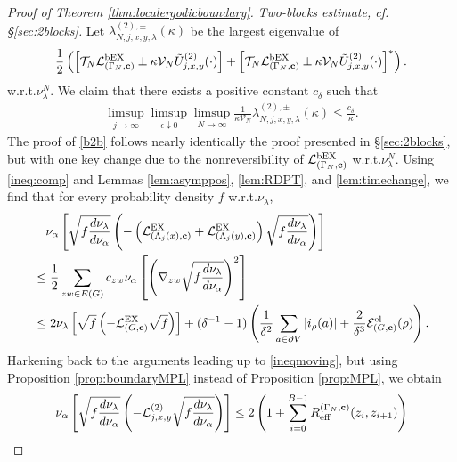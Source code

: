 \documentclass[11pt]{amsart}
\theoremstyle{plain}
\theoremstyle{definition}
\theoremstyle{remark}
\begin{document}
\begin{proof}[Proof of Theorem \ref{thm:localergodicboundary}]
\emph{Two-blocks estimate, \emph{cf.\@} \S\ref{sec:2blocks}.} 
Let $\lambda^{(2),\pm}_{N,j,x,y,\lambda}(\kappa)$ be the largest eigenvalue of
\begin{align*}
\frac{1}{2}\left(\left[\mathcal{T}_N \mathcal{L}^{\rm bEX}_{(\Gamma_N,{\bf c})} \pm \kappa \mathcal{V}_N {\tilde{U}^{(2)}_{{{j}},{{x}},{{y}}}}(\cdot)\right]+ \left[\mathcal{T}_N \mathcal{L}^{\rm bEX}_{(\Gamma_N,{\bf c})} \pm \kappa \mathcal{V}_N {\tilde{U}^{(2)}_{{{j}},{{x}},{{y}}}}(\cdot)\right]^*\right).
\end{align*}
w.r.t.\@ $\nu_\lambda^N$. We claim that there exists a positive constant $c_{\delta}$ such that
\begin{align}
\label{b2b}
\limsup_{j\to\infty}\limsup_{\epsilon \downarrow 0}\limsup_{N\to\infty} \frac{1}{\kappa \mathcal{V}_N} \lambda^{(2),\pm}_{N,j,x,y,\lambda}(\kappa) \leq \frac{c_{\delta}}{\kappa}.
\end{align}
The proof of \eqref{b2b} follows nearly identically the proof presented in \S\ref{sec:2blocks}, but with one key change due to the nonreversibility of $\mathcal{L}^{\rm bEX}_{(\Gamma_N, {\bf c})}$ w.r.t.\@ $\nu_\lambda^N$. 
Using \eqref{ineq:comp} and Lemmas \ref{lem:asymppos}, \ref{lem:RDPT}, and \ref{lem:timechange}, we find that for every probability density $f$ w.r.t.\@ $\nu_\lambda$,
\begin{align*}
& \quad \nu_\alpha\left[\sqrt{f\frac{d\nu_\lambda}{d\nu_\alpha}}\left( -\left(\mathcal{L}^{\rm EX}_{(\Lambda_j(x),{\bf c})} + \mathcal{L}^{\rm EX}_{(\Lambda_j(y), {\bf c})}\right)\sqrt{f \frac{d\nu_\lambda}{d\nu_\alpha}}\right)\right]  \\
& \leq \frac{1}{2} \sum_{zw\in E(G)} c_{zw} \nu_\alpha\left[\left(\nabla_{zw}\sqrt{f\frac{d\nu_\lambda}{d\nu_\alpha}}\right)^2 \right]\\
& \leq 2\nu_\lambda\left[\sqrt{f}\left(-\mathcal{L}^{\rm EX}_{(G,{\bf c})} \sqrt{f}\right) \right] + (\delta^{-1}-1)\left(\frac{1}{\delta^2} \sum_{a\in \partial V} |i_\rho(a)| + \frac{2}{\delta^3} \mathcal{E}^{\rm el}_{(G,{\bf c})} (\rho) \right).
\end{align*}
Harkening back to the arguments leading up to \eqref{ineqmoving}, but using Proposition \ref{prop:boundaryMPL} instead of Proposition \ref{prop:MPL}, we obtain
\begin{align*}
\nu_\alpha&\left[\sqrt{f\frac{d\nu_\lambda}{d\nu_\alpha}}\left(-\mathcal{L}^{(2)}_{j,x,y}\sqrt{ f\frac{d\nu_\lambda}{d\nu_\alpha}}\right) \right] 
\leq 2\left(1+\sum_{i=0}^{B-1} R_{\rm eff}^{(\Gamma_N, {\bf c})}(z_i, z_{i+1})\right) \\

\end{align*}
\end{proof}
\end{document}
